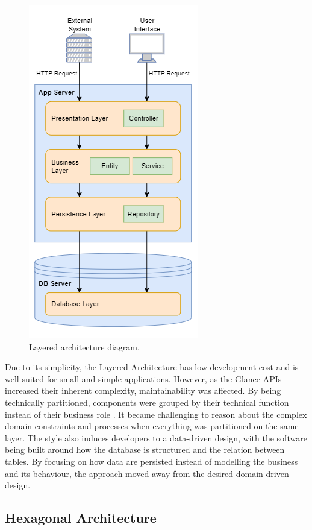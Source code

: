 \begin{figure}[htbp]
  \centering
  \includegraphics[scale=0.55]{Imagens/chap04/layered-architecture-on-frapi.png}
  \caption{Layered architecture diagram.}
  \label{fig:layered-architecture-on-frapi}
\end{figure}

Due to its simplicity, the Layered Architecture has low development cost and is well suited for small and simple applications. However, as the Glance APIs increased their inherent complexity, maintainability was affected. By being technically partitioned, components were grouped by their technical function instead of their business role \cite{richards-architecture}. It became challenging to reason about the complex domain constraints and processes when everything was partitioned on the same layer. The style also induces developers to a data-driven design, with the software being built around how the database is structured and the relation between tables. By focusing on how data are persisted instead of modelling the business and its behaviour, the approach moved away from the desired domain-driven design.

\subsection{Hexagonal Architecture}
\label{sec:ports-and-adapters}


